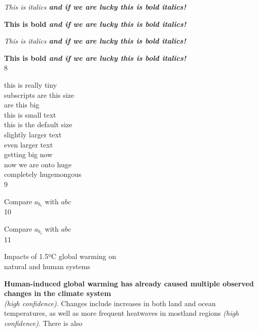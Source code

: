 \documentclass{article} %
\begin{document}
\bigskip

\textit{This is italics \textbf{and if we are lucky this is bold italics!}}

\textbf{This is bold \textit{and if we are lucky this is bold italics!}}

\bigskip

{\itshape This is italics {\bfseries and if we are lucky this is bold italics!}}

{\bfseries This is bold {\itshape and if we are lucky this is bold italics!}}\\

8


{\tiny this is really tiny}\\
{\scriptsize subscripts are this size}\\
{\footnotesize are this big}\\
{\small this is small text}\\
{\normalsize this is the default size}\\
{\large slightly larger text}\\
{\Large even larger text}\\
{\LARGE getting big now}\\
{\huge now we are onto huge }\\
{\Huge completely hugemongous }\\

9

Compare $a_{b_c}$ with $a{\scriptstyle b}{\scriptscriptstyle c}$\\

10 

Compare $a_{b_c}$ with $a{\scriptstyle b}{\scriptscriptstyle c}$\\

11


	
\begin{center}
\Large Impacts of 1.5ºC global warming on\\
natural and human systems
\end{center}

\noindent
\textbf{Human-induced global warming has already caused 
multiple observed changes in the climate system}\\

\textit{(high confidence)}. Changes include increases in both
land and ocean temperatures, as well as more frequent heatwaves
in mostland regions \textit{(high confidence)}. There is also\\
 
\end{document}
